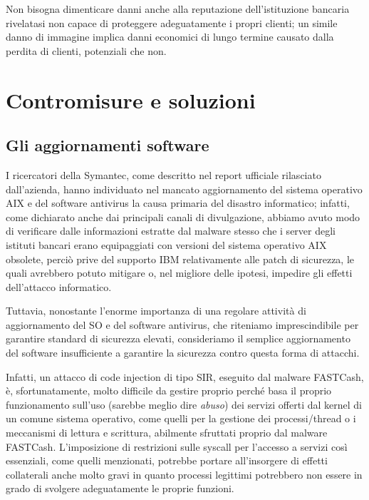 \documentclass[10pt,a4paper, titlepage]{report}
\begin{document}
Non bisogna dimenticare danni anche alla reputazione dell'istituzione bancaria rivelatasi non capace di proteggere adeguatamente i propri clienti; un simile danno di immagine implica danni economici di lungo termine causato dalla perdita di clienti, potenziali che non.


\section{Contromisure e soluzioni}

\subsection{Gli aggiornamenti software}

I ricercatori della Symantec, come descritto nel report ufficiale rilasciato dall'azienda, hanno individuato nel mancato aggiornamento del sistema operativo AIX e del software antivirus la causa primaria del disastro informatico; infatti, come dichiarato anche dai principali canali di divulgazione, abbiamo avuto modo di verificare dalle informazioni estratte dal malware stesso che i server degli istituti bancari erano equipaggiati con versioni del sistema operativo AIX obsolete, perciò prive del supporto IBM relativamente alle patch di sicurezza, le quali avrebbero potuto mitigare o, nel migliore delle ipotesi, impedire gli effetti dell'attacco informatico.

Tuttavia, nonostante l'enorme importanza di una regolare attività di aggiornamento del SO e del software antivirus, che riteniamo imprescindibile per garantire standard di sicurezza elevati, consideriamo il semplice aggiornamento del software insufficiente a garantire la sicurezza contro questa forma di attacchi.

Infatti, un attacco di code injection di tipo SIR, eseguito dal malware FASTCash, è, sfortunatamente, molto difficile da gestire proprio perché basa il proprio funzionamento sull'uso (sarebbe meglio dire \textit{abuso}) dei servizi offerti dal kernel di un comune sistema operativo, come quelli per la gestione dei processi/thread o i meccanismi di lettura e scrittura, abilmente sfruttati proprio dal malware FASTCash. L'imposizione di restrizioni sulle syscall per l'accesso a servizi così essenziali, come quelli menzionati, potrebbe portare all'insorgere di effetti collaterali anche molto gravi in quanto processi legittimi potrebbero non essere in grado di svolgere adeguatamente le proprie funzioni.
\end{document}
